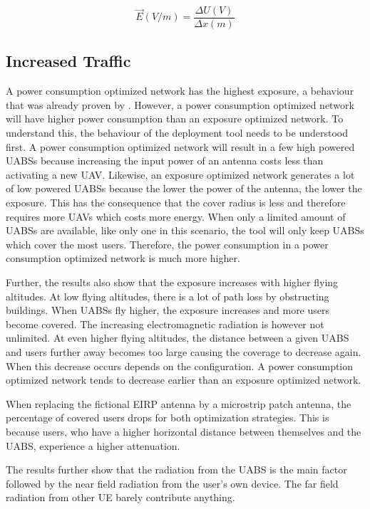 \documentclass[twocolumn]{phdsymp} %
\begin{document}
\begin{equation}
\vec{E} (V/m) = \frac{\Delta U (V) }{\Delta x (m)}
\label{eq:exposureBasicFormula}
\end{equation}

\subsection{Increased Traffic}

A power consumption optimized network has the highest exposure, a behaviour that was already proven by \cite{J1}. 
However, a power consumption optimized network will have higher power consumption than an exposure optimized network. 
To understand this, the behaviour of the deployment tool needs to be understood first. 
A power consumption optimized network will result in a few high powered \gls{UABS}s because increasing the input power of an antenna costs 
less than activating a new  \gls{UAV}. Likewise, an exposure optimized network 
generates a lot of low powered \gls{UABS}s because the lower the power of the antenna, the lower the exposure. This has the consequence that the cover radius 
is less and therefore requires more \gls{UAV}s which costs more energy.
When only a limited amount of \gls{UABS}s are available, 
like only one in this scenario, the tool will only keep \gls{UABS}s which cover the most users. 
Therefore, the power consumption in a power consumption optimized network is much more higher. 

Further, the results also show that the exposure increases with higher flying altitudes. At low flying altitudes, 
there is a lot of path loss by obstructing buildings. When 
\gls{UABS}s fly higher, the exposure increases and more users become covered. 
The increasing electromagnetic radiation is however not unlimited.
At even higher
flying altitudes, the distance between a given \gls{UABS} and users further away becomes too large causing the 
coverage to decrease again. When this decrease occurs depends on the configuration. A power consumption optimized 
network tends to decrease earlier than an exposure optimized network.

When replacing the fictional \gls{EIRP} antenna by a microstrip patch antenna, the percentage of covered users drops for both 
optimization strategies. This is because users, who have a higher horizontal distance between themselves and the \gls{UABS}, 
experience a higher attenuation.

The results further show  
that the radiation from the \gls{UABS} is the main factor followed by the near field radiation from the user's own device.
The far field radiation from other \gls{UE} barely contribute anything.
\end{document}
